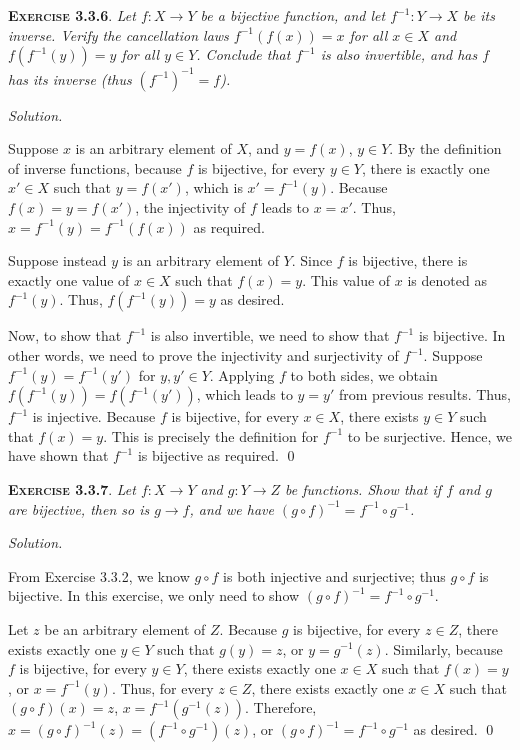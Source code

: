 \documentclass[12pt]{article}
\theoremstyle{remark}
\newenvironment{exer}[2]{
    \noindent \setlength{\parskip}{1em}%
    \textsc{\textbf{Exercise #1}}. \textit{#2} \par
    \noindent \textit{Solution.} %
}{\bigskip}
\begin{document}
\begin{exer}{3.3.6}{
    Let $f: X \to Y$ be a bijective function, and let $f^{-1} : Y \to X$ be its inverse.
    Verify the cancellation laws $f^{-1} (f(x)) = x$ for all $x \in X$ and $f(f^{-1}(y)) = y$ for all $y \in Y$.
    Conclude that $f^{-1}$ is also invertible, and has $f$ has its inverse (thus $(f^{-1})^{-1} = f$).
}
    Suppose $x$ is an arbitrary element of $X$, and $y = f(x)$, $y \in Y$.
    By the definition of inverse functions, because $f$ is bijective, for every $y \in Y$, there is exactly one $x' \in X$ such that $y = f(x')$, which is $x' = f^{-1}(y)$.
    Because $f(x) = y = f(x')$, the injectivity of $f$ leads to $x = x'$.
    Thus, $x = f^{-1}(y) = f^{-1}(f(x))$ as required.

    Suppose instead $y$ is an arbitrary element of $Y$.
    Since $f$ is bijective, there is exactly one value of $x \in X$ such that $f(x) = y$.
    This value of $x$ is denoted as $f^{-1}(y)$.
    Thus, $f(f^{-1}(y)) = y$ as desired.

    Now, to show that $f^{-1}$ is also invertible, we need to show that $f^{-1}$ is bijective.
    In other words, we need to prove the injectivity and surjectivity of $f^{-1}$.
    Suppose $f^{-1}(y) = f^{-1}(y')$ for $y, y' \in Y$.
    Applying $f$ to both sides, we obtain $f(f^{-1}(y)) = f(f^{-1}(y'))$, which leads to $y = y'$ from previous results.
    Thus, $f^{-1}$ is injective.
    Because $f$ is bijective, for every $x \in X$, there exists $y \in Y$ such that $f(x) = y$.
    This is precisely the definition for $f^{-1}$ to be surjective.
    Hence, we have shown that $f^{-1}$ is bijective as required. \qed
\end{exer}


\begin{exer}{3.3.7}{
    Let $f : X \to Y$ and $g : Y \to Z$ be functions.
    Show that if $f$ and $g$ are bijective, then so is $g \to f$, and we have $(g \circ f)^{-1} = f^{-1} \circ g^{-1}$.
}
    From Exercise 3.3.2, we know $g \circ f$ is both injective and surjective; thus $g \circ f$ is bijective.
    In this exercise, we only need to show $(g \circ f)^{-1} = f^{-1} \circ g^{-1}$.

    Let $z$ be an arbitrary element of $Z$.
    Because $g$ is bijective, for every $z \in Z$, there exists exactly one $y \in Y$ such that $g(y) = z$, or $y = g^{-1}(z)$.
    Similarly, because $f$ is bijective, for every $y \in Y$, there exists exactly one $x \in X$ such that $f(x) = y$, or $x = f^{-1}(y)$.
    Thus, for every $z \in Z$, there exists exactly one $x \in X$ such that $(g \circ f)(x) = z$, $x = f^{-1}(g^{-1}(z))$.
    Therefore, $x = (g \circ f)^{-1}(z) = (f^{-1} \circ g^{-1})(z)$, or $(g \circ f)^{-1} = f^{-1} \circ g^{-1}$ as desired. \qed
\end{exer}
\end{document}

